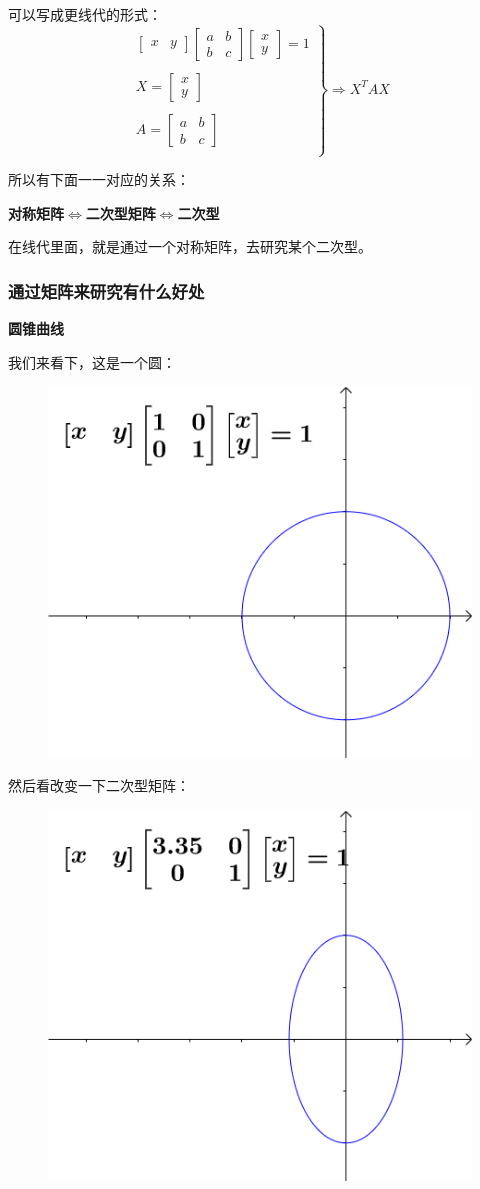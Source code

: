 \documentclass[12pt]{article}
\begin{document}
可以写成更线代的形式：
$$
\left.
\begin{matrix}
\begin{bmatrix}x & y\end{bmatrix}
\begin{bmatrix}a&b\\b&c\end{bmatrix}
\begin{bmatrix}x \\ y\end{bmatrix} = 1 \\
\\
X =  \begin{bmatrix}x \\ y\end{bmatrix}\\
\\
A = \begin{bmatrix}a&b\\b&c\end{bmatrix} \\
\end{matrix}
\right\}
\Rightarrow X^TAX
$$

所以有下面一一对应的关系：
\begin{center}
\textbf{对称矩阵$\Longleftrightarrow$二次型矩阵$\Longleftrightarrow$二次型}
\end{center}

在线代里面，就是通过一个对称矩阵，去研究某个二次型。

\subsubsection{通过矩阵来研究有什么好处}
\textbf{圆锥曲线}

我们来看下，这是一个圆：
\begin{figure}[H]
    \centering
    \includegraphics[width=.3\textwidth]{fig/UnderstandQuadraticForm_3.png}
\end{figure} 

然后看改变一下二次型矩阵：
\begin{figure}[H]
    \centering
    \includegraphics[width=.3\textwidth]{fig/UnderstandQuadraticForm_4.png}
\end{figure} 
\end{document}
